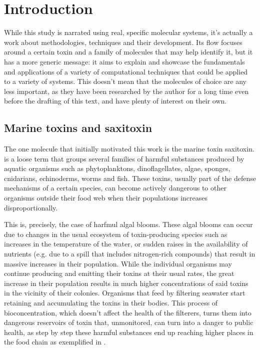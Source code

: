 \chapter{Introduction}

While this study is narrated using real, specific molecular systems, it's actually a work about methodologies, techniques and their development.
Its flow focuses around a certain toxin and a family of molecules that may help identify it, but it has a more generic message: it aims to explain and showcase the fundamentals and applications of a variety of computational techniques that could be applied to a variety of systems.
This doesn't mean that the molecules of choice are any less important, as they have been researched by the author for a long time even before the drafting of this text, and have plenty of interest on their own.

\section{Marine toxins and saxitoxin}

The one molecule that initially motivated this work is the marine toxin saxitoxin.
 is a loose term that groups several families of harmful substances produced by aquatic organisms such as phytoplanktons, dinoflagellates, algae, sponges, cnidarians, echinoderms, worms and fish.
These toxins, usually part of the defense mechanisms of a certain species, can become actively dangerous to other organisms outside their food web when their populations increases disproportionally.

This is, precisely, the case of harfmul algal blooms.
These algal blooms can occur due to changes in the usual ecosystem of toxin-producing species such as increases in the temperature of the water, or sudden raises in the availability of nutrients (e.g. due to a spill that includes nitrogen-rich compounds) that result in massive increases in their population.\cite{michalak13,chakraborty10,gobler17}
While the individual organisms may continue producing and emitting their toxins at their usual rates, the great increase in their population results in much higher concentrations of said toxins in the vicinity of their colonies.
Organisms that feed by filtering seawater start retaining and accumulating the toxins in their bodies.\cite{oikawa05}
This process of bioconcentration, which doesn't affect the health of the filterers, turns them into dangerous reservoirs of toxin that, unmonitored, can turn into a danger to public health, as step by step these harmful substances end up reaching higher places in the food chain as exemplified in .

